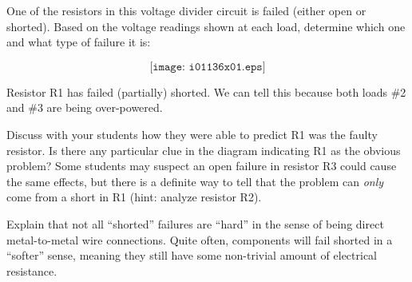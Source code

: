 

One of the resistors in this voltage divider circuit is failed (either open or shorted).  Based on the voltage readings shown at each load, determine which one and what type of failure it is:

$$\texttt{[image: i01136x01.eps]}$$







Resistor R1 has failed (partially) shorted.  We can tell this because both loads \#2 and \#3 are being over-powered.







Discuss with your students how they were able to predict R1 was the faulty resistor.  Is there any particular clue in the diagram indicating R1 as the obvious problem?  Some students may suspect an open failure in resistor R3 could cause the same effects, but there is a definite way to tell that the problem can {\it only} come from a short in R1 (hint: analyze resistor R2). 

Explain that not all ``shorted'' failures are ``hard'' in the sense of being direct metal-to-metal wire connections.  Quite often, components will fail shorted in a ``softer'' sense, meaning they still have some non-trivial amount of electrical resistance.




